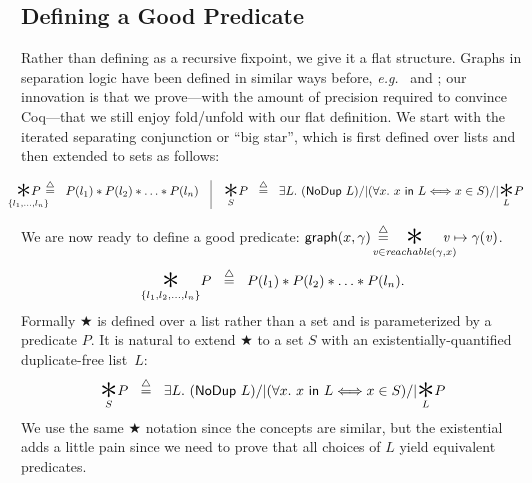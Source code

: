 

\subsection{Defining a Good  Predicate}\label{sec:goodgraph}

Rather than defining  as a recursive fixpoint,
we give it a flat structure.  Graphs in separation
logic have been defined in similar ways before, \emph{e.g.}~\citet{ilya-graphs}
and \citet{charpott19};
our innovation is that we prove---with the amount of precision
required to convince Coq---that we still enjoy fold/unfold
with our flat definition.  We start with the iterated
separating conjunction or ``big star'', which is first defined over
lists and then extended to sets as follows:

\vspace{-1em}
\[
\begin{array}{@{}l@{}}
\!\!\!\!\!\!\!\underset{\{l_1,\dots,l_n\}}{\bigstar P}\!\!\!\!\!\!\! ~~ \defeq ~~ P(l_1) *
  P(l_2) * \dots * P(l_n) \quad \vline \quad
\underset{S}{\bigstar} P ~~ \defeq ~~ \exists L.~ (\p{NoDup}\ L) /| (\forall x.~ x\ \p{in}\ L <=> x \in S) /| \underset{L}{\bigstar}P
\end{array}
\]

We are now ready to define a good  predicate:
  \quad $\p{graph}(x, \gamma) \; \defeq \; \!\!\!\!\!\!\!\!\!\!\underset{\m{v} \in \mathit{reachable}(\gamma, x)}{\bigstar}\!\!\!\!\!\!\m{v}\mapsto\gamma(\m{v})$.
\iffalse
\begin{equation*}
  \underset{\{l_1, l_2,\dots,l_n\}}{\bigstar}P ~~ \defeq ~~ P(l_1) *
  P(l_2) * \dots * P(l_n).
\end{equation*}
Formally $\bigstar$ is defined over a list rather than a set and is parameterized by a predicate $P$.  It is natural to extend $\bigstar$ to a set $S$ with an existentially-quantified duplicate-free list~$L$:
\[
\underset{S}{\bigstar} P ~~ \defeq ~~ \exists L.~ (\p{NoDup}\ L) /| (\forall x.~ x\ \p{in}\ L <=> x \in S) /| \underset{L}{\bigstar}P
\]
We use the same $\bigstar$ notation since the concepts are similar, but the existential adds a little pain since we need to prove that all choices of $L$ yield equivalent predicates.

